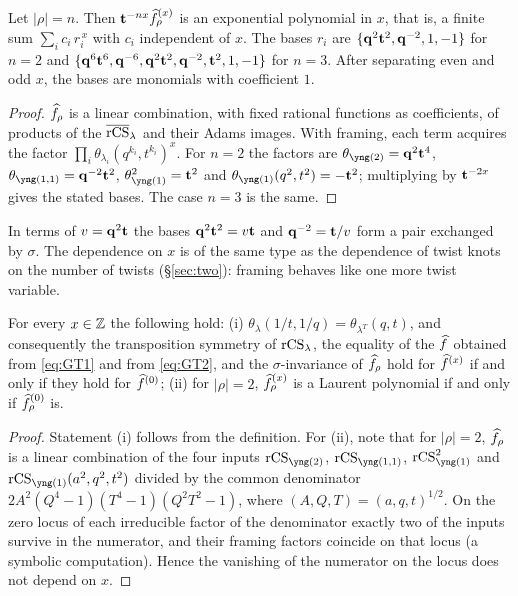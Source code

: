 \begin{proposition}\label{prop:expsum}
Let $|\rho|=n$. Then $\mathbf{t}^{-nx}\widehat{f}^{(x)}_\rho$ is an exponential polynomial in $x$, that is, a finite sum $\sum_i c_i\,r_i^{\,x}$ with $c_i$ independent of $x$.
The bases $r_i$ are $\{\mathbf{q}^2\mathbf{t}^2,\mathbf{q}^{-2},1,-1\}$ for $n=2$ and $\{\mathbf{q}^6\mathbf{t}^6,\mathbf{q}^{-6},\mathbf{q}^2\mathbf{t}^2,\mathbf{q}^{-2},\mathbf{t}^2,1,-1\}$ for $n=3$.
After separating even and odd $x$, the bases are monomials with coefficient $1$.
\end{proposition}
\begin{proof}
$\widehat{f}_\rho$ is a linear combination, with fixed rational functions as coefficients, of products of the $\overline{\mathrm{rCS}}_\lambda$ and their Adams images.
With framing, each term acquires the factor $\prod_i\theta_{\lambda_i}(q^{k_i},t^{k_i})^x$.
For $n=2$ the factors are $\theta_{\yng(2)}=\bq^2\bt^4$, $\theta_{\yng(1,1)}=\bq^{-2}\bt^2$, $\theta_{\yng(1)}^2=\bt^2$ and $\theta_{\yng(1)}(q^2,t^2)=-\bt^2$;
multiplying by $\mathbf{t}^{-2x}$ gives the stated bases. The case $n=3$ is the same.
\end{proof}
In terms of $v=\mathbf{q}^2\mathbf{t}$ the bases $\mathbf{q}^2\mathbf{t}^2=v\mathbf{t}$ and $\mathbf{q}^{-2}=\mathbf{t}/v$ form a pair exchanged by $\sigma$.
The dependence on $x$ is of the same type as the dependence of twist knots on the number of twists (\S\ref{sec:two}): framing behaves like one more twist variable.

\begin{proposition}\label{prop:x-indep}
For every $x\in\mathbb{Z}$ the following hold:
{\rm(i)} $\theta_\lambda(1/t,1/q)=\theta_{\lambda^T}(q,t)$, and consequently the transposition symmetry of $\mathrm{rCS}_\lambda$, the equality of the $\widehat{f}$ obtained from \eqref{eq:GT1} and from \eqref{eq:GT2},
and the $\sigma$-invariance of $\widehat{f}_\rho$ hold for $\widehat{f}^{(x)}$ if and only if they hold for $\widehat{f}^{(0)}$;
{\rm(ii)} for $|\rho|=2$, $\widehat{f}^{(x)}_\rho$ is a Laurent polynomial if and only if $\widehat{f}^{(0)}_\rho$ is.
\end{proposition}
\begin{proof}
Statement (i) follows from the definition.
For (ii), note that for $|\rho|=2$, $\widehat{f}_\rho$ is a linear combination of the four inputs $\rCS_{\yng(2)}$, $\rCS_{\yng(1,1)}$, $\rCS_{\yng(1)}^2$ and $\rCS_{\yng(1)}(a^2,q^2,t^2)$
divided by the common denominator $2A^2(Q^4-1)(T^4-1)(Q^2T^2-1)$, where $(A,Q,T)=(a,q,t)^{1/2}$.
On the zero locus of each irreducible factor of the denominator exactly two of the inputs survive in the numerator, and their framing factors coincide on that locus (a symbolic computation).
Hence the vanishing of the numerator on the locus does not depend on $x$.
\end{proof}

